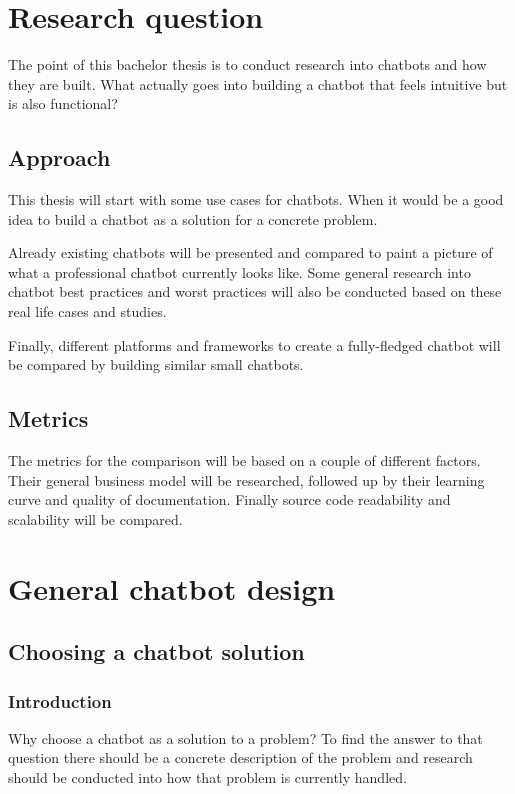 \chapter{Research question}

The point of this bachelor thesis is to conduct research into chatbots and how they are built. What actually goes into building a chatbot that feels intuitive but is also functional?

\section{Approach}

This thesis will start with some use cases for chatbots. When it would be a good idea to build a chatbot as a solution for a concrete problem.

Already existing chatbots will be presented and compared to paint a picture of what a professional chatbot currently looks like.
Some general research into chatbot best practices and worst practices will also be conducted based on these real life cases and studies.

Finally, different platforms and frameworks to create a fully-fledged chatbot will be compared by building similar small chatbots.

\section{Metrics}

The metrics for the comparison will be based on a couple of different factors. Their general business model will be researched, followed up by their learning curve and quality of documentation. Finally source code readability and scalability will be compared.

\chapter{General chatbot design}

\section{Choosing a chatbot solution}

\subsection{Introduction}

Why choose a chatbot as a solution to a problem? To find the answer to that question there should be a concrete description of the problem and research should be conducted into how that problem is currently handled.

